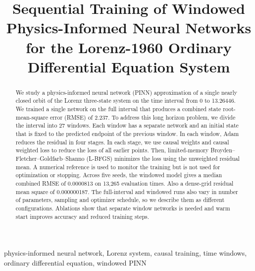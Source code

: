 \documentclass[conference,a4paper]{IEEEtran}
\begin{document}
\title{Sequential Training of Windowed Physics-Informed Neural Networks for the Lorenz-1960 Ordinary Differential Equation System}

\author{}

\maketitle

\begin{abstract}
We study a physics-informed neural network (PINN) approximation of a single nearly closed orbit of the Lorenz three-state system on the time interval from 0 to 13.26446. We trained a single network on the full interval that produces a combined state root-mean-square error (RMSE) of 2.237. To address this long horizon problem, we divide the interval into 27 windows. Each window has a separate network and an initial state that is fixed to the predicted endpoint of the previous window. In each window, Adam reduces the residual in four stages. In each stage, we use causal weights and causal weighted loss to reduce the loss of all earlier points. Then, limited-memory Broyden–Fletcher–Goldfarb–Shanno (L-BFGS) minimizes the loss using the unweighted residual mean. A numerical reference is used to monitor the training but is not used for optimization or stopping. Across five seeds, the windowed model gives a median combined RMSE of 0.0000813 on 13,265 evaluation times. Also a dense-grid residual mean square of 0.000000187. The full-interval and windowed runs also vary in number of parameters, sampling and optimizer schedule, so we describe them as different configurations. Ablations show that separate window networks is needed and warm start improves accuracy and reduced training steps.

\end{abstract}

\begin{IEEEkeywords}
physics-informed neural network, Lorenz system, causal training, time windows, ordinary differential equation, windowed PINN
\end{IEEEkeywords}
\end{document}
